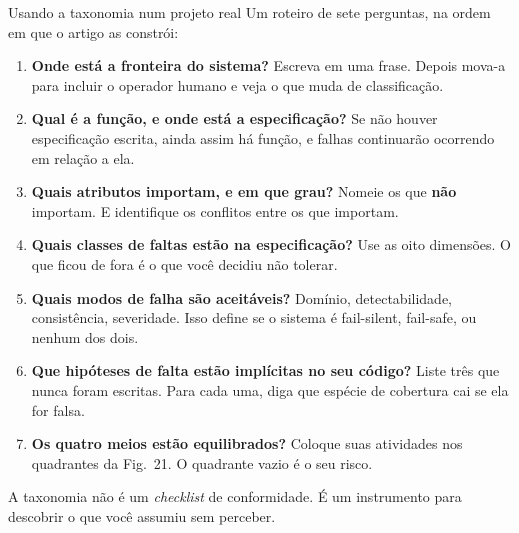 \documentclass{beamer}
\begin{document}
\begin{frame}{Usando a taxonomia num projeto real}
    \footnotesize
    Um roteiro de sete perguntas, na ordem em que o artigo as constr\'oi:
    \medskip
    \begin{enumerate}
        \item \textbf{Onde est\'a a fronteira do sistema?} Escreva em uma frase. Depois mova-a para incluir o operador humano e veja o que muda de classifica\c{c}\~ao.
        \item \textbf{Qual \'e a fun\c{c}\~ao, e onde est\'a a especifica\c{c}\~ao?} Se n\~ao houver especifica\c{c}\~ao escrita, ainda assim h\'a fun\c{c}\~ao, e falhas continuar\~ao ocorrendo em rela\c{c}\~ao a ela.
        \item \textbf{Quais atributos importam, e em que grau?} Nomeie os que \textbf{n\~ao} importam. E identifique os conflitos entre os que importam.
        \item \textbf{Quais classes de faltas est\~ao na especifica\c{c}\~ao?} Use as oito dimens\~oes. O que ficou de fora \'e o que voc\^e decidiu n\~ao tolerar.
        \item \textbf{Quais modos de falha s\~ao aceit\'aveis?} Dom\'inio, detectabilidade, consist\^encia, severidade. Isso define se o sistema \'e fail-silent, fail-safe, ou nenhum dos dois.
        \item \textbf{Que hip\'oteses de falta est\~ao implícitas no seu c\'odigo?} Liste tr\^es que nunca foram escritas. Para cada uma, diga que esp\'ecie de cobertura cai se ela for falsa.
        \item \textbf{Os quatro meios est\~ao equilibrados?} Coloque suas atividades nos quadrantes da Fig.\ 21. O quadrante vazio \'e o seu risco.
    \end{enumerate}
    \medskip
    \begin{ancora}
        \footnotesize
        A taxonomia n\~ao \'e um \textit{checklist} de conformidade. \'E um instrumento para descobrir o que voc\^e assumiu sem perceber.
    \end{ancora}
\end{frame}
\end{document}

